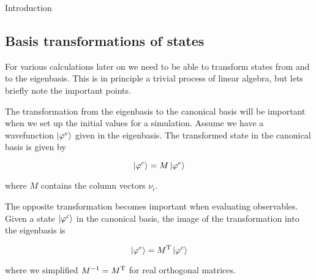 \begin{chapter}{Introduction}
\subsection{Basis transformations of states}
\label{sec:basis_transformations_of_states}

For various calculations later on we need to be able to transform states from and to
the eigenbasis. This is in principle a trivial process of linear algebra, but lets
briefly note the important points.

The transformation from the eigenbasis to the canonical basis will be important
when we set up the initial values for a simulation. Assume we have a wavefunction
$\Ket{\varphi^e}$ given in the eigenbasis. The transformed state in the canonical
basis is given by

\begin{equation}
  \Ket{\varphi^c} = M \Ket{\varphi^e}
\end{equation}

where $M$ contains the column vectors $\nu_i$.

The opposite transformation becomes important when evaluating observables. Given
a state $\Ket{\varphi^c}$ in the canonical basis, the image of the transformation
into the eigenbasis is

\begin{equation}
  \Ket{\varphi^e} = M{}^{\textnormal{T}} \Ket{\varphi^c}
\end{equation}

where we simplified $M^{-1} = M{}^{\textnormal{T}}$ for real orthogonal matrices.

\end{chapter}
